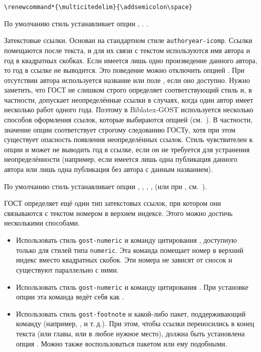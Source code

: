 \documentclass[11pt,a4paper,headings=small,numbers=enddot,english,russian]{ltxdockit}[2011/03/25]
\newcommand*{\biblatex}{Biblatex\xspace}
\newcommand*{\biblatexgost}{\biblatex-GOST\xspace}
\newcommand*{\bibsty}{\texttt}
\begin{document}
\begin{marglist}
\begin{lstlisting}[style=latex]
\renewcommand*{\multicitedelim}{\addsemicolon\space}
\end{lstlisting}

По умолчанию стиль устанавливает опции , .
.

\item[gost-authoryear]
Затекстовые ссылки. Основан на стандартном 
стиле \bibsty{authoryear-icomp}. Ссылки помещаются после текста, и для их связи 
с текстом используются имя автора и год в квадратных скобках. Если имеется лишь одно
произведение данного автора, то год в ссылке не выводится. Это поведение можно 
отключить опцией . При отсутствии автора
используется название или поле , если оно доступно. Нужно заметить, что ГОСТ 
не слишком строго определяет соответствующий стиль и, в частности, допускает неопределённые 
ссылки в случаях, когда один автор имеет несколько 
работ одного года. Поэтому в \biblatexgost используется несколько способов оформления
ссылок, которые выбираются опцией  (см.~).
В частности, значение опции  соответствует строгому 
следованию ГОСТу, хотя при этом существует опасность появления неопределённых ссылок.
Стиль чувствителен к опции  и может не выводить год в ссылке, если он 
не требуется для устранения неопределённости (например, если имеется лишь одна публикация 
данного автора или лишь одна публикация без автора с данным названием).

По умолчанию стиль устанавливает опции 
, 
,
,
,
 (или  при , 
см.~). 

\end{marglist}

ГОСТ определяет ещё один тип затекстовых ссылок, при котором они 
связываются с текстом номером в верхнем индексе. Этого можно достичь несколькими способами. 

\begin{itemize}
\item Использовать стиль \bibsty{gost-numeric} и команду цитирования  
, доступную только для стилей типа \bibsty{numeric}. Эта команда
помещает номер в верхний индекс вместо квадратных скобок. Эти номера не зависят от 
сносок  и существуют параллельно с ними.
\item Использовать стиль \bibsty{gost-numeric} и команду цитирования
. При установке опции  эта команда ведёт себя 
как .
\item Использовать стиль \bibsty{gost-footnote} и какой-либо пакет, поддерживающий команду  (например, ,  и т.\,д.). 
При этом, чтобы ссылки переносились в конец текста (или главы, или в любое 
нужное место), должна быть установлена
опция . Можно также воспользоваться 
пакетом  или ему подобными.
\end{itemize}
\end{document}

